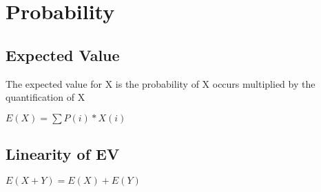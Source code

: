 \section{Probability}

\subsection{Expected Value}

The expected value for X is the probability of X occurs multiplied by the quantification of X

$E(X) = \sum P(i) * X(i)$

\subsection{Linearity of EV}

$ E(X+Y)=E(X)+E(Y) $
